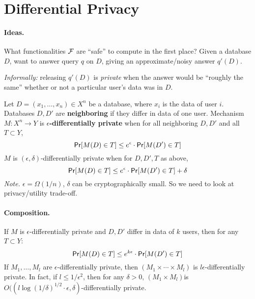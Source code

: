 \newcommand{\Lap}{\mathsf{Lap}}
\newcommand{\score}{\mathsf{score}}
\newcommand{\cL}{\mathcal{L}}
\newcommand{\cC}{\mathcal{C}}
\newcommand{\bR}{\mathbb{R}}
\newcommand{\ass}[1]{\left(#1\right)}

\section{Differential Privacy}

\paragraph{Ideas.}
What functionalities $\mathcal{F}$ are ``safe'' to compute in the first place?
Given a database $D$, want to answer query $q$ on $D$, giving an approximate/noisy answer $q'(D)$.

\textit{Informally:} releasing $q'(D)$ is \textit{private} when the answer would be ``roughly the same'' whether or not a particular user's data was in $D$.

\begin{defn}
Let $D = (x_1, \dots, x_n) \in X^n$ be a database, where $x_i$ is the data of user $i$.
Databases $D,D'$ are \textbf{neighboring} if they differ in data of one user.
Mechanism $M : X^n \to Y$ is \textbf{$\epsilon$-differentially private} when for all neighboring $D, D'$ and all $T \subset Y$,
\[
    \mathsf{Pr}[M(D) \in T] \leq e^\epsilon \cdot \mathsf{Pr}[M(D') \in T]
\]
$M$ is $(\epsilon, \delta)$-differentially private when for $D, D', T$ as above,
\[
    \mathsf{Pr}[M(D) \in T] \leq e^\epsilon \cdot \mathsf{Pr}[M(D') \in T] + \delta
\]
\textit{Note.} $\epsilon = \Omega(1/n)$, $\delta$ can be cryptographically small. So we need to look at privacy/utility trade-off.
\end{defn}

\paragraph{Composition.}

If $M$ is $\epsilon$-differentially private and $D, D'$ differ in data of $k$ users, then for any $T \subset Y$:
\[
    \mathsf{Pr}[M(D) \in T] \leq e^{k \epsilon} \cdot \mathsf{Pr}[M(D') \in T]
\]
If $M_1, \dots, M_l$ are $\epsilon$-differentially private, then $(M_1 \times \cdots \times M_l)$ is $l \epsilon$-differentially private.
In fact, if $l \leq 1/\epsilon^2$, then for any $\delta > 0$, 
$(M_1 \times M_l)$is $O((l \log(1/\delta)^{1/2} \cdot \epsilon, \delta)$-differentially private.

